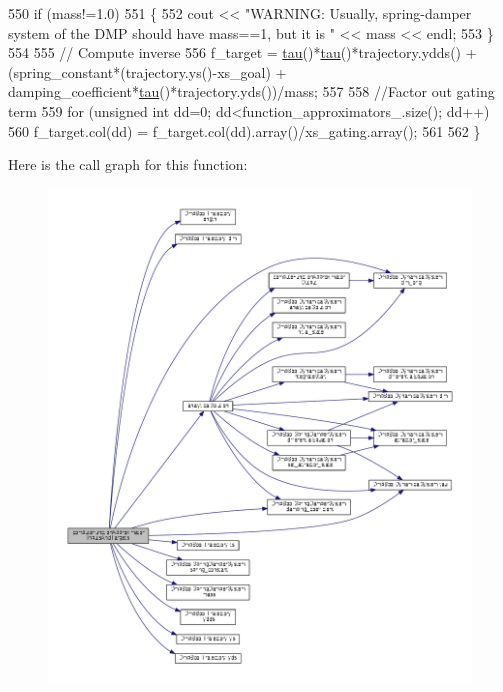 \begin{DoxyCode}
550   \textcolor{keywordflow}{if} (mass!=1.0)
551   \{
552     cout << \textcolor{stringliteral}{"WARNING: Usually, spring-damper system of the DMP should have mass==1, but it is "} << mass << 
      endl;
553   \}
554 
555   \textcolor{comment}{// Compute inverse}
556   f\_target = \hyperlink{group__DynamicalSystems_ga50eec7ad4c9664b5809ace45b22200d5}{tau}()*\hyperlink{group__DynamicalSystems_ga50eec7ad4c9664b5809ace45b22200d5}{tau}()*trajectory.ydds() + (spring\_constant*(trajectory.ys()-xs\_goal) + 
      damping\_coefficient*\hyperlink{group__DynamicalSystems_ga50eec7ad4c9664b5809ace45b22200d5}{tau}()*trajectory.yds())/mass;
557   
558   \textcolor{comment}{//Factor out gating term}
559   \textcolor{keywordflow}{for} (\textcolor{keywordtype}{unsigned} \textcolor{keywordtype}{int} dd=0; dd<function\_approximators\_.size(); dd++)
560     f\_target.col(dd) = f\_target.col(dd).array()/xs\_gating.array();
561  
562 \}
\end{DoxyCode}


Here is the call graph for this function\+:
\nopagebreak
\begin{figure}[H]
\begin{center}
\leavevmode
\includegraphics[width=350pt]{classDmpBbo_1_1Dmp_a9aef6cbf41e55caa12b62cff77cf1fda_cgraph}
\end{center}
\end{figure}



